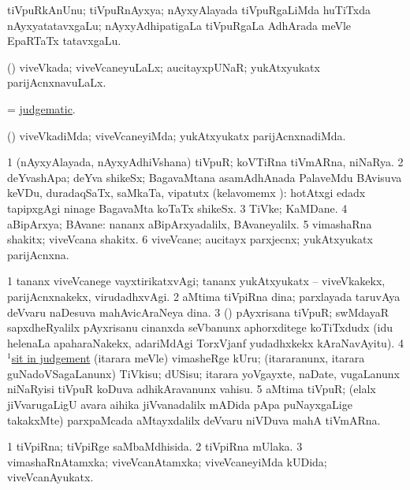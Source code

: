\bentry
{}
\gl{\nA}
\bmng
tiVpuRkAnUnu; tiVpuRnAyxya; nAyxyAlayada tiVpuRgaLiMda huTiTxda nAyxyatatavxgaLu; nAyxyAdhipatigaLa tiVpuRgaLa AdhArada meVle EpaRTaTx tatavxgaLu. 
\emng
\eentry

\bentry
{}
\gl{\gu}
\bmng
(\AmA) viveVkada; viveVcaneyuLaLx; aucitayxpUNaR; yukAtxyukatx parijAcnxnavuLaLx. 
\emng
\eentry

\bentry
{}
\gl{\gu}
\bmng
 = \hyperlink{judgematic}{judgematic}. 
\emng
\eentry

\bentry
{}
\gl{\kirxvi}
\bmng
(\AmA) viveVkadiMda; viveVcaneyiMda; yukAtxyukatx parijAcnxnadiMda. 
\emng
\eentry

\bentry
{}
\gl{\nA}
\bmng
\bnum
\num{1} (nAyxyAlayada, nAyxyAdhiVshana) tiVpuR; koVTiRna tiVmARna, niNaRya. 
\num{2} deYvashApa; deYva shikeSx; BagavaMtana asamAdhAnada PalaveMdu BAvisuva keVDu, duradaqSaTx, saMkaTa, vipatutx (kelavomemx \hA):  hotAtxgi edadx tapipxgAgi ninage BagavaMta koTaTx shikeSx. 
\num{3} TiVke; KaMDane. 
\num{4} aBipArxya; BAvane:  nananx aBipArxyadalilx, BAvaneyalilx. 
\num{5} vimashaRna shakitx; viveVcana shakitx. 
\num{6} viveVcane; aucitayx parxjecnx; yukAtxyukatx parijAcnxna. 
\enum
\emng

\noindent
\gl{\pagu}
\bmng
\bnum
\num{1}  tananx viveVcanege vayxtirikatxvAgi; tananx yukAtxyukatx -- viveVkakekx, parijAcnxnakekx, virudadhxvAgi. 
\num{2}  aMtima tiVpiRna dina; parxlayada taruvAya deVvaru naDesuva mahAvicAraNeya dina. 
\num{3}  (\girxVpu) pAyxrisana tiVpuR; swMdayaR sapxdheRyalilx pAyxrisanu cinanxda seVbanunx aphorxditege koTiTxdudx (idu helenaLa apaharaNakekx, adariMdAgi TorxVjanf yudadhxkekx kAraNavAyitu). 
\num{4} \hyperref{kandict_s.pdf}{S}{sit(1) pagu(12)}{$^1$sit in judgement} (itarara meVle) vimasheRge kUru; (itararanunx, itarara guNadoVSagaLanunx) TiVkisu; dUSisu; itarara yoVgayxte, naDate, \mo vugaLanunx niNaRyisi tiVpuR koDuva adhikAravanunx vahisu. 
\num{5}  aMtima tiVpuR; (elalx jiVvarugaLigU avara aihika jiVvanadalilx mADida pApa puNayxgaLige takakxMte) parxpaMcada aMtayxdalilx deVvaru niVDuva mahA tiVmARna. 
\enum
\emng
\eentry

\bentry
{}
\gl{\gu}
\bmng
\bnum
\num{1} tiVpiRna; tiVpiRge saMbaMdhisida. 
\num{2} tiVpiRna mUlaka. 
\num{3} vimashaRnAtamxka; viveVcanAtamxka; viveVcaneyiMda kUDida; viveVcanAyukatx. 
\enum
\emng
\eentry

